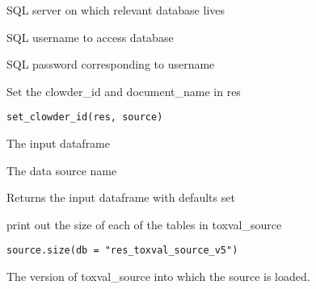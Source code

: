 \documentclass[letterpaper]{book}
\begin{document}
%
\begin{Arguments}
\begin{ldescription}
\item[\code{server}] SQL server on which relevant database lives

\item[\code{user}] SQL username to access database

\item[\code{password}] SQL password corresponding to username
\end{ldescription}
\end{Arguments}
%
\begin{Description}\relax
Set the clowder\_id and document\_name in res
\end{Description}
%
\begin{Usage}
\begin{verbatim}
set_clowder_id(res, source)
\end{verbatim}
\end{Usage}
%
\begin{Arguments}
\begin{ldescription}
\item[\code{res}] The input dataframe

\item[\code{source}] The data source name
\end{ldescription}
\end{Arguments}
%
\begin{Value}
Returns the input dataframe with defaults set
\end{Value}
%
\begin{Description}\relax
print out the size of each of the tables in toxval\_source
\end{Description}
%
\begin{Usage}
\begin{verbatim}
source.size(db = "res_toxval_source_v5")
\end{verbatim}
\end{Usage}
%
\begin{Arguments}
\begin{ldescription}
\item[\code{db}] The version of toxval\_source into which the source is loaded.
\end{ldescription}
\end{Arguments}
\end{document}
